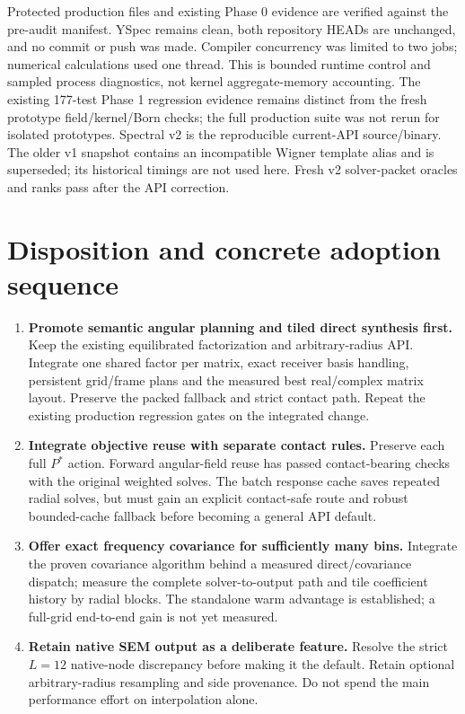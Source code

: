 \MemoryText

Protected production files and existing Phase 0 evidence are verified against the pre-audit manifest. YSpec remains clean, both repository HEADs are unchanged, and no commit or push was made. Compiler concurrency was limited to two jobs; numerical calculations used one thread. This is bounded runtime control and sampled process diagnostics, not kernel aggregate-memory accounting. The existing 177-test Phase 1 regression evidence remains distinct from the fresh prototype field/kernel/Born checks; the full production suite was not rerun for isolated prototypes. Spectral v2 is the reproducible current-API source/binary. The older v1 snapshot contains an incompatible Wigner template alias and is superseded; its historical timings are not used here. Fresh v2 solver-packet oracles and ranks pass after the API correction.

\section{Disposition and concrete adoption sequence}
\begin{enumerate}
\item \textbf{Promote semantic angular planning and tiled direct synthesis first.} Keep the existing equilibrated factorization and arbitrary-radius API. Integrate one shared factor per matrix, exact receiver basis handling, persistent grid/frame plans and the measured best real/complex matrix layout. Preserve the packed fallback and strict contact path. Repeat the existing production regression gates on the integrated change.
\item \textbf{Integrate objective reuse with separate contact rules.} Preserve each full $P^*$ action. Forward angular-field reuse has passed contact-bearing checks with the original weighted solves. The batch response cache saves repeated radial solves, but must gain an explicit contact-safe route and robust bounded-cache fallback before becoming a general API default.
\item \textbf{Offer exact frequency covariance for sufficiently many bins.} Integrate the proven covariance algorithm behind a measured direct/covariance dispatch; measure the complete solver-to-output path and tile coefficient history by radial blocks. The standalone warm advantage is established; a full-grid end-to-end gain is not yet measured.
\item \textbf{Retain native SEM output as a deliberate feature.} Resolve the strict $L=12$ native-node discrepancy before making it the default. Retain optional arbitrary-radius resampling and side provenance. Do not spend the main performance effort on interpolation alone.
\end{enumerate}

